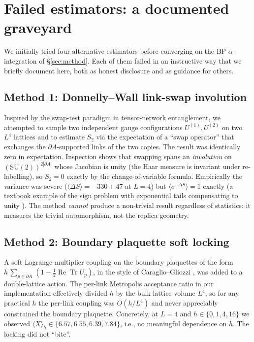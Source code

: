 \documentclass[11pt,a4paper]{article}
\theoremstyle{definition}
\newcommand{\Tr}{\operatorname{Tr}}
\renewcommand{\Re}{\operatorname{Re}}
\newcommand{\half}{\tfrac{1}{2}}
\newcommand{\SUtwo}{\mathrm{SU}(2)}
\begin{document}
\section{Failed estimators: a documented graveyard}
\label{sec:failed}

We initially tried four alternative estimators before converging on
the BP $\alpha$-integration of \S\ref{sec:method}. Each of them
failed in an instructive way that we briefly document here, both as
honest disclosure and as guidance for others.

\subsection{Method 1: Donnelly--Wall link-swap involution}

Inspired by the swap-test paradigm in tensor-network entanglement,
we attempted to sample two independent gauge configurations
$U^{(1)}, U^{(2)}$ on two $L^4$ lattices and to estimate $S_2$ via
the expectation of a ``swap operator'' that exchanges the
$\partial A$-supported links of the two copies. The result was
identically zero in expectation. Inspection shows that swapping
spans an \emph{involution} on $(\SUtwo)^{2|\partial A|}$ whose
Jacobian is unity (the Haar measure is invariant under
re-labelling), so $S_2 = 0$ exactly by the change-of-variable
formula. Empirically the variance was severe ($\langle \Delta S
\rangle = -330 \pm 47$ at $L = 4$) but $\langle e^{-\Delta S}\rangle
= 1$ exactly (a textbook example of the sign problem with exponential
tails compensating to unity \cite{Hastings2010}). The method
\emph{cannot} produce a non-trivial result regardless of statistics:
it measures the trivial automorphism, not the replica geometry.

\subsection{Method 2: Boundary plaquette soft locking}

A soft Lagrange-multiplier coupling on the boundary plaquettes of the
form $h\,\sum_{p \in \partial A}\,(1 - \half\Re\Tr U_p)$, in the
style of Caraglio--Gliozzi \cite{CaraglioGliozzi2008}, was added to a
double-lattice action. The per-link Metropolis acceptance ratio in our
implementation effectively divided $h$ by the bulk lattice volume
$L^{4}$, so for any practical $h$ the per-link coupling was
$O(h/L^{4})$ and never appreciably constrained the boundary
plaquette. Concretely, at $L = 4$ and $h \in \{0, 1, 4, 16\}$ we
observed $\langle X \rangle_h \in \{6.57, 6.55, 6.39, 7.84\}$, i.e.,
no meaningful dependence on $h$. The locking did not ``bite''.
\end{document}
